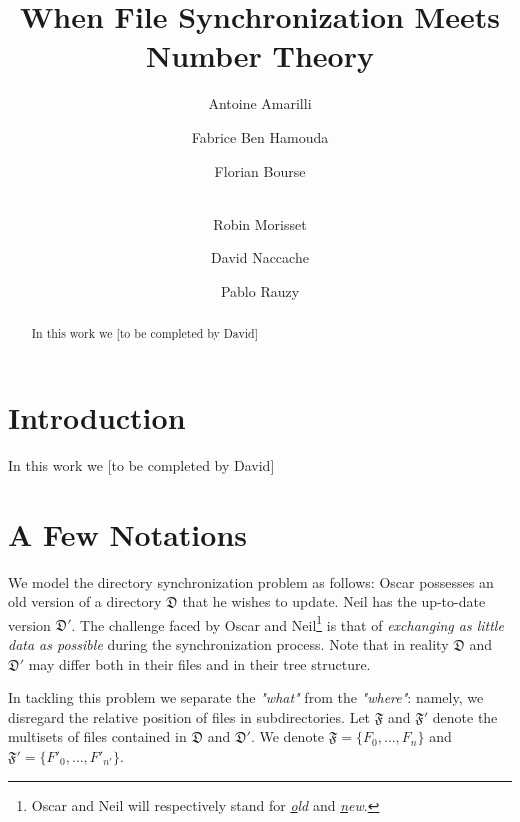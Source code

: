 \documentclass[11pt]{llncs}
\begin{document}
\title{When File Synchronization Meets Number Theory}

\author{Antoine Amarilli \and Fabrice Ben Hamouda \and Florian Bourse \and\\ 
Robin Morisset \and David Naccache \and Pablo Rauzy}


\maketitle

\begin{abstract}

In this work we [to be completed by David]

\end{abstract}

\section{Introduction}

In this work we [to be completed by David]

\section{A Few Notations}

We model the directory synchronization problem as follows: Oscar possesses an old version of a directory $\mathfrak{D}$ that he wishes to update. Neil has the up-to-date version $\mathfrak{D}'$. The challenge faced by Oscar and Neil\footnote{Oscar and Neil will respectively stand for {\sl \underline{o}ld} and {\sl \underline{n}ew}.} is that of {\sl exchanging as little data as possible} during the synchronization process. Note that in reality $\mathfrak{D}$ and $\mathfrak{D}'$ may differ both in their files and in their tree structure.\smallskip

In tackling this problem we separate the {\sl "what"} from the {\sl "where"}: namely, we disregard the relative position of files in subdirectories. Let $\mathfrak{F}$ and $\mathfrak{F}'$ denote the multisets of files contained in $\mathfrak{D}$ and $\mathfrak{D}'$. We denote $\mathfrak{F}=\{F_0,\ldots,F_{n}\}$ and $\mathfrak{F}'=\{F'_0,\ldots,F'_{n'}\}$.\smallskip
\end{document}
